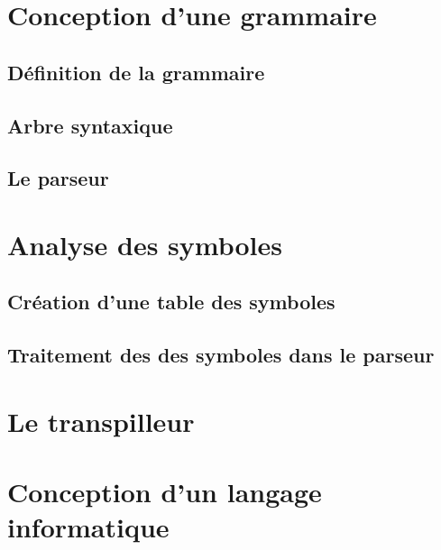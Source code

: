 \documentclass[a4paper]{article}%
\begin{document}
\clearpage{}
\setcounter{secnumdepth}{1}



\section{Conception d'une grammaire}
\subsection{Définition de la grammaire}
\subsection{Arbre syntaxique}
\subsection{Le parseur}

\section{Analyse des symboles}
\subsection{Création d'une table des symboles}
\subsection{Traitement des des symboles dans le parseur}

\section{Le transpilleur}

\section{Conception d'un langage informatique}
\end{document}
